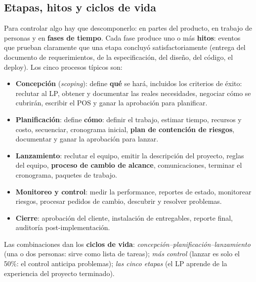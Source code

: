 \documentclass[11pt,a4paper]{article}
\begin{document}
\subsection{Etapas, hitos y ciclos de vida}
\label{sec:etapas}
Para controlar algo hay que descomponerlo: en partes del producto, en trabajo de personas y en \textbf{fases de
tiempo}. Cada fase produce uno o más \textbf{hitos}: eventos que prueban claramente que una etapa concluyó
satisfactoriamente (entrega del documento de requerimientos, de la especificación, del diseño, del código, el
deploy). Los cinco procesos típicos son:
\begin{itemize}
  \item \textbf{Concepción} (\emph{scoping}): define \textbf{qué} se hará, incluidos los criterios de éxito:
  reclutar al LP, obtener y documentar las reales necesidades, negociar cómo se cubrirán, escribir el POS y
  ganar la aprobación para planificar.
  \item \textbf{Planificación}: define \textbf{cómo}: definir el trabajo, estimar tiempo, recursos y costo,
  secuenciar, cronograma inicial, \textbf{plan de contención de riesgos}, documentar y ganar la aprobación para
  lanzar.
  \item \textbf{Lanzamiento}: reclutar el equipo, emitir la descripción del proyecto, reglas del equipo,
  \textbf{proceso de cambio de alcance}, comunicaciones, terminar el cronograma, paquetes de trabajo.
  \item \textbf{Monitoreo y control}: medir la performance, reportes de estado, monitorear riesgos, procesar
  pedidos de cambio, descubrir y resolver problemas.
  \item \textbf{Cierre}: aprobación del cliente, instalación de entregables, reporte final, auditoría
  post-implementación.
\end{itemize}
Las combinaciones dan los \textbf{ciclos de vida}: \emph{concepción--planificación--lanzamiento} (una o dos
personas: sirve como lista de tareas); \emph{más control} (lanzar es solo el 50\%: el control anticipa
problemas); \emph{las cinco etapas} (el LP aprende de la experiencia del proyecto terminado).
\end{document}

